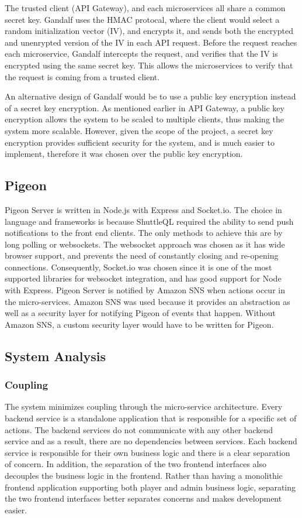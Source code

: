 \documentclass{article}
\begin{document}
The trusted client (API Gateway), and each microservices all share a common secret key. Gandalf uses the HMAC protocal, where the client would select a random initialization vector (IV), and encrypts it, and sends both the encrypted and unenrypted version of the IV in each API request. Before the request reaches each microservice, Gandalf intercepts the request, and verifies that the IV is encrypted using the same secret key. This allows the microservices to verify that the request is coming from a trusted client.

An alternative design of Gandalf would be to use a public key encryption instead of a secret key encryption. As mentioned earlier in API Gateway, a public key encryption allows the system to be scaled to multiple clients, thus making the system more scalable. However, given the scope of the project, a secret key encryption provides sufficient security for the system, and is much easier to implement, therefore it was chosen over the public key encryption.

\subsection{Pigeon}
Pigeon Server is written in Node.js with Express and Socket.io. The choice in language and frameworks is because ShuttleQL required the ability to send push notifications to the front end clients. The only methods to achieve this are by long polling or websockets. The websocket approach was chosen as it has wide browser support, and prevents the need of constantly closing and re-opening connections. Consequently, Socket.io was chosen since it is one of the most supported libraries for websocket integration, and has good support for Node with Express. Pigeon Server is notified by Amazon SNS when actions occur in the micro-services. Amazon SNS was used because it provides an abstraction as well as a security layer for notifying Pigeon of events that happen. Without Amazon SNS, a custom security layer would have to be written for Pigeon.

\subsection{System Analysis}

\subsubsection{Coupling}
The system minimizes coupling through the micro-service architecture. Every backend service is a standalone application that is responsible for a specific set of actions. The backend services do not communicate with any other backend service and as a result, there are no dependencies between services. Each backend service is responsible for their own business logic and there is a clear separation of concern. In addition, the separation of the two frontend interfaces also decouples the business logic in the frontend. Rather than having a monolithic frontend application supporting both player and admin business logic, separating the two frontend interfaces better separates concerns and makes development easier.
\end{document}
